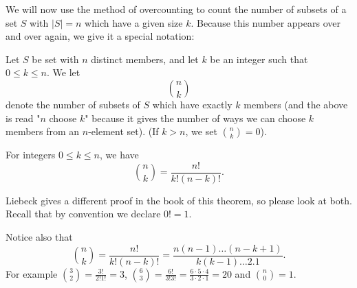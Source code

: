 \documentclass[11pt,dvipsnames]{book}
\numberwithin{equation}{section} %
\numberwithin{figure}{section} %
\numberwithin{table}{section} %
\begin{document}
We will now use the method of overcounting to count the number of subsets of a set $S$ with $|S|=n$ which have a given size $k$. Because this number appears over and over again, we give it a special notation:\\

\begin{definition}
Let $S$ be set with $n$ distinct members, and let $k$ be an integer such that $0\leq k\leq n$. We let 
\[
{n \choose k}
\]
denote the number of subsets of $S$ which have exactly $k$ members (and the above is read "$n$ choose $k$" because it gives the number of ways we can choose $k$ members from an $n$-element set). (If $k>n$, we set ${n \choose k}=0$). 
\end{definition}


\begin{theorem}\label{t:choose}
For integers $0\leq k\leq n$, we have 
\begin{equation}
\label{e:choose}
{n \choose k}=\frac{n!}{k!(n-k)!}
.\end{equation}
\end{theorem}

Liebeck gives a different proof in the book of this theorem, so please look at both. Recall that by convention we declare $0! = 1$. 

Notice also that 
\begin{equation}
{n \choose k}=\frac{n!}{k!(n-k)!} = \frac{n(n-1) \dots(n-k +1)}{k(k-1) \dots 2. 1}. 
\end{equation}
For example ${3 \choose 2} = \frac{3!}{2!1!} = 3$, 
${6 \choose 3} = \frac{6!}{3!3!} = \frac{6 \cdot 5 \cdot 4}{3 \cdot 2 \cdot 1} =20$ and ${n \choose 0} =1$.
\end{document}
